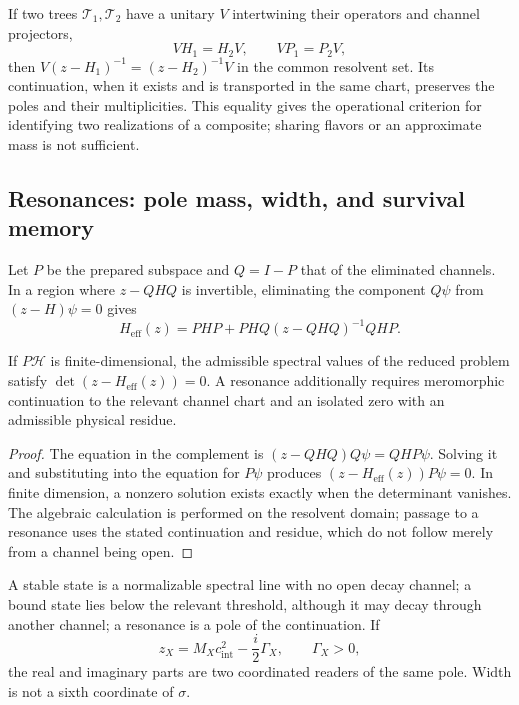 If two trees \(\mathcal T_1,\mathcal T_2\) have a unitary
\(V\) intertwining their operators and channel projectors,
\[
 VH_1=H_2V,\qquad VP_1=P_2V,
\]
then \(V(z-H_1)^{-1}=(z-H_2)^{-1}V\) in the common resolvent set.
Its continuation, when it exists and is transported in the same chart,
preserves the poles and their multiplicities. This equality gives the operational
criterion for identifying two realizations of a composite; sharing
flavors or an approximate mass is not sufficient.

\subsection{Resonances: pole mass, width, and survival memory}
\label{vi:vi:subsec:resonancias-familias}

Let \(P\) be the prepared subspace and \(Q=I-P\) that of the
eliminated channels. In a region where \(z-QHQ\) is invertible, eliminating
the component \(Q\psi\) from \((z-H)\psi=0\) gives
\begin{equation}
 H_{\mathrm{eff}}(z)=PHP+PHQ(z-QHQ)^{-1}QHP.
 \label{vi:vi:eq:feshbach-familias}
\end{equation}

\begin{proposition}
\label{vi:vi:prop:feshbach-familias}
If \(P\mathcal H\) is finite-dimensional, the admissible spectral
values of the reduced problem satisfy
\(\det(z-H_{\mathrm{eff}}(z))=0\). A resonance additionally requires
meromorphic continuation to the relevant channel chart and an isolated
zero with an admissible physical residue.
\end{proposition}
\begin{proof}
The equation in the complement is
\((z-QHQ)Q\psi=QHP\psi\). Solving it and substituting into the equation
for \(P\psi\) produces \((z-H_{\mathrm{eff}}(z))P\psi=0\).
In finite dimension, a nonzero solution exists exactly when
the determinant vanishes. The algebraic calculation is performed on the resolvent
domain; passage to a resonance uses the stated continuation and
residue, which do not follow merely from a channel being open.
\end{proof}

A stable state is a normalizable spectral line with no open decay
channel; a bound state lies below the relevant threshold,
although it may decay through another channel; a resonance is a
pole of the continuation. If
\[
 z_X=M_Xc_{\mathrm{int}}^2-\frac{i}{2}\Gamma_X,
 \qquad\Gamma_X>0,
\]
the real and imaginary parts are two coordinated readers of the same
pole. Width is not a sixth coordinate of \(\sigma\).

